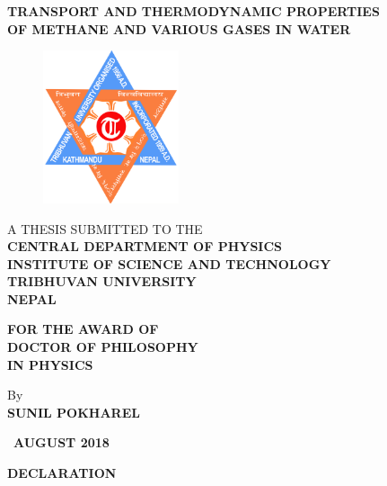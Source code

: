 \mbox{}
\thispagestyle{empty}
\newpage
\begin{titlepage}
     \centering
    {\large\bf TRANSPORT AND THERMODYNAMIC PROPERTIES \\OF METHANE AND VARIOUS GASES IN WATER}
    
    \vspace{2cm}
    
    \begin{figure}[!h]
    \centering
    \includegraphics[width = 4cm, keepaspectratio]{logo.png}
    \end{figure}
    
    \vspace{1cm}
    
    \begin{center}
    { A THESIS SUBMITTED TO THE \\
    \textbf{CENTRAL DEPARTMENT OF PHYSICS \\
    INSTITUTE OF SCIENCE AND TECHNOLOGY \\
    TRIBHUVAN UNIVERSITY \\
    NEPAL}}
    
    \vspace{2cm}
    
    {\bf FOR THE AWARD OF \\
    DOCTOR OF PHILOSOPHY \\
    IN PHYSICS}
    \end{center}
    
    \vspace{2cm}
    
    \begin{center}
    {\large By} \\
    {\textbf{SUNIL POKHAREL}}	
    
    \vfill
    
    {\ \bf AUGUST 2018}
    \end{center}
\end{titlepage}
\newpage
{}
{}
\begin{center}
\Large\bf DECLARATION 
\end{center}
\vspace*{2.0cm}
 
